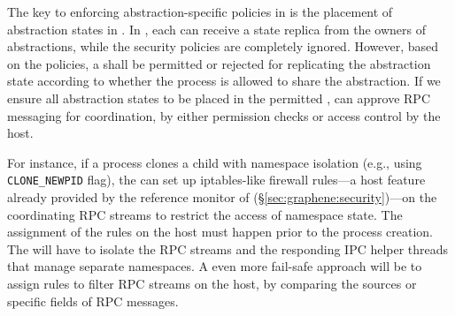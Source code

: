 The key to enforcing abstraction-specific policies in \liboses{}
is the placement of abstraction states
in \picoprocs{}.
In \graphene{}, each \picoproc{} can receive a state replica
from the owners of abstractions,
while the security policies are completely ignored.
However, based on the policies,
a \picoproc{} shall be permitted or rejected for
replicating the abstraction state according to whether the process is allowed to share the abstraction.
If we ensure all abstraction states to be placed in the permitted \picoprocs{},
\liboses{} can approve RPC messaging for coordination,
by either permission checks
or access control by the host.

For instance,
if a process clones a child with namespace isolation
(e.g., using {\tt CLONE\_NEWPID} flag),
the \libos{} can set up iptables-like firewall rules---a host feature
already provided by the reference monitor of \graphene{} (\S\ref{sec:graphene:security})---on the coordinating RPC streams
to restrict the access of namespace state.
The assignment of the rules on the host must happen
prior to the process creation.
The \libos{} will have to isolate the RPC streams and the responding IPC helper threads that manage separate namespaces.
A even more fail-safe approach will be to assign 
 rules to filter RPC streams on the host,
by comparing the sources or specific fields of RPC messages.







